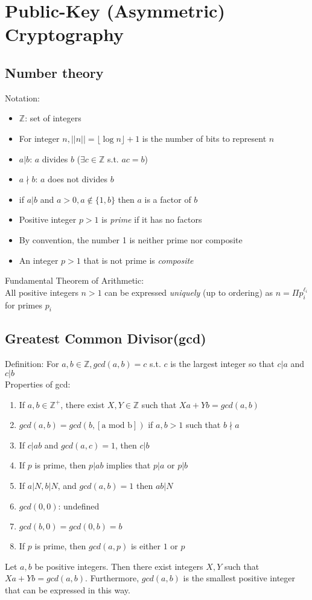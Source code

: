 \section{Public-Key (Asymmetric) Cryptography}

\subsection*{Number theory}
Notation:
\begin{itemize}
    \item $\mathbb{Z}$: set of integers
    \item For integer $n,||n||=\lfloor \log n \rfloor + 1$ is the number of 
    bits to represent $n$
    \item $a|b$: $a$ divides $b$ ($\exists c\in \mathbb{Z}$ s.t. $ac=b$)
    \item $a\nmid b$: $a$ does not divides $b$
    \item if $a|b$ and $a>0,a\notin \{1,b\}$ then $a$ is a factor of $b$
    \item Positive integer $p>1$ is \emph{prime} if it has no factors
    \item By convention, the number 1 is neither prime nor composite
    \item An integer $p>1$ that is not prime is \emph{composite}
\end{itemize}
Fundamental Theorem of Arithmetic:\\
All positive integers $n > 1$ can be expressed \emph{uniquely} (up to ordering) as
 $n=\Pi p_i^{\ell_i}$ for primes $p_i$

\subsection*{Greatest Common Divisor(gcd)}
Definition: For $a,b\in \mathbb{Z},gcd(a,b)=c$ s.t. $c$ is the largest integer
so that $c|a$ and $c|b$\\
Properties of gcd:
\begin{enumerate}
    \item If $a,b\in \mathbb{Z}^+$, there exist $X,Y\in \mathbb{Z}$ such that
    $Xa+Yb=gcd(a,b)$
    \item $gcd(a,b)=gcd(b,[\text{a mod b}])$ if $a,b>1$ such that $b \nmid a$
    \item If $c|ab$ and $gcd(a,c)=1$, then $c|b$
    \item If $p$ is prime, then $p|ab$ implies that $p|a$ or $p|b$
    \item If $a|N,b|N$, and $gcd(a,b)=1$ then $ab|N$
    \item $gcd(0,0)$: undefined
    \item $gcd(b,0)=gcd(0,b)=b$
    \item If $p$ is prime, then $gcd(a,p)$ is either $1$ or $p$
\end{enumerate}
Let $a,b$ be positive integers. Then there exist integers $X, Y$ such that
 $X a + Y b = gcd(a, b)$. Furthermore, $gcd(a, b)$ is the smallest positive
  integer that can be expressed in this way.

